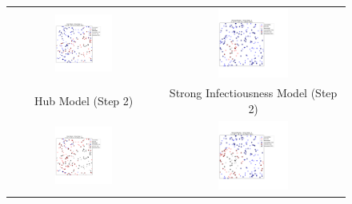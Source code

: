 \documentclass{article}
\begin{document}
\begin{figure}[!htbp]
    \centering
    \begin{tabular}{cc}
        \includegraphics[width=0.4\textwidth]{fig/sir_hub_step_2.png} &
        \includegraphics[width=0.4\textwidth]{fig/sir_strong_step_2.png} \\
        Hub Model (Step 2) & Strong Infectiousness Model (Step 2) \\
        \includegraphics[width=0.4\textwidth]{fig/sir_hub_step_3.png} &
        \includegraphics[width=0.4\textwidth]{fig/sir_strong_step_3.png} \\

\end{tabular}
\end{figure}
\end{document}
